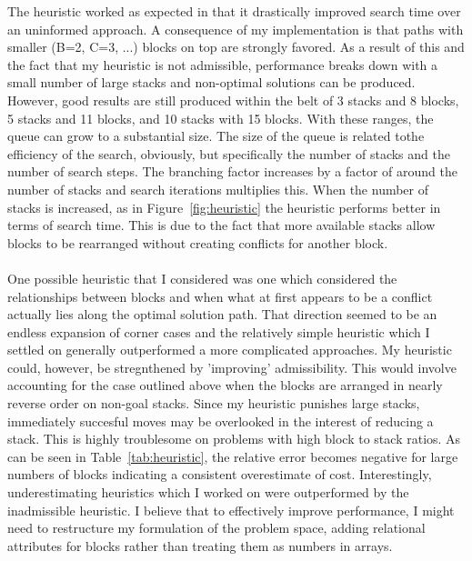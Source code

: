 \documentclass{article}
\begin{document}
The heuristic worked as expected in that it drastically improved search time
over an uninformed approach. A consequence of my implementation is that paths
with smaller (B=2, C=3, ...) blocks on top are strongly favored. As a result of
this and the fact that my heuristic is not admissible, performance breaks down 
with a small number of large stacks and non-optimal solutions can be produced.
However, good results are still produced within the belt of 3 stacks and 8
blocks, 5 stacks and 11 blocks, and 10 stacks with 15 blocks. With these ranges,
the queue can grow to a substantial size. The size of the queue is related tothe
efficiency of the search, obviously, but specifically the number of stacks and
the number of search steps. The branching factor increases by a factor of
around the number of stacks and search iterations multiplies this.
When the number of stacks is increased, as in Figure~\ref{fig:heuristic} the 
heuristic performs better in terms of search time. This is due to the fact that 
more available stacks allow blocks to be rearranged without creating conflicts
for another block.\\\\ 
One possible heuristic that I considered was one which
considered the relationships between blocks and when what at first appears to be
a conflict actually lies along the optimal solution path. That direction seemed
to be an endless expansion of corner cases and the relatively simple heuristic
which I settled on generally outperformed a more complicated approaches. My
heuristic could, however, be stregnthened by 'improving' admissibility. This would
involve accounting for the case outlined above when the blocks are arranged in
nearly reverse order on non-goal stacks. Since my heuristic punishes large
stacks, immediately succesful moves may be overlooked in the interest of
reducing a stack. This is highly troublesome on problems with high block to
stack ratios. As can be seen in
Table~\ref{tab:heuristic}, the relative error becomes negative for large numbers
of blocks indicating a consistent overestimate of cost. Interestingly,
underestimating heuristics which I worked on were outperformed by the
inadmissible heuristic. I believe that to effectively improve performance, I
might need to restructure my formulation of the problem space, adding relational
attributes for blocks rather than treating them as numbers in arrays.
\end{document}
